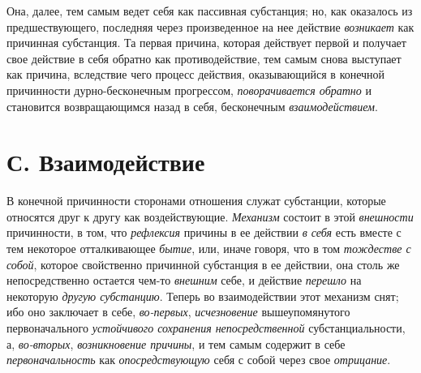 Она, далее, тем самым ведет себя как пассивная субстанция; но, как оказалось
из предшествующего, последняя через произведенное на нее действие
{\em возникает} как причинная субстанция. Та первая
причина, которая действует первой и получает свое действие в себя обратно
как противодействие, тем самым снова выступает как причина, вследствие чего
процесс действия, оказывающийся в конечной причинности дурно-бесконечным
прогрессом, {\em поворачивается обратно} и становится
возвращающимся назад в себя, бесконечным {\em взаимодействием}.


\section[С. Взаимодействие]{С. Взаимодействие}

В конечной причинности сторонами отношения
служат субстанции, которые относятся друг к другу как воздействующие.
{\em Механизм} состоит в этой {\em внешности} причинности, в том, что
{\em рефлексия} причины в ее действии
{\em в себя} есть вместе с тем некоторое отталкивающее
{\em бытие}, или, иначе говоря, что в том
{\em тождестве с собой}, которое свойственно причинной
субстанция в ее действии, она столь же непосредственно остается чем-то
{\em внешним} себе, и действие {\em перешло} на некоторую
{\em другую субстанцию}. Теперь во взаимодействии этот
механизм снят; ибо оно заключает в себе, {\em во-первых}, {\em исчезновение}
вышеупомянутого первоначального {\em устойчивого
сохранения непосредственной} субстанциальности, а,
{\em во-вторых}, {\em возникновение причины}, и тем самым содержит в себе
{\em первоначальность} как {\em опосредствующую} себя с собой через свое
{\em отрицание}.

